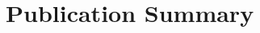\newcommand{\arxiv}[1]{[\href{http://arxiv.org/abs/#1}{arXiv:#1}]}
\def\zero{0}
\def\one{1}
\newcommand{\citeCount}[1]{%
  \def\val{#1}
  \ifx\val\zero%
  \else%
    \ifx\val\one%
    (1~citation)%
    \else%
    (#1~citations)%
    \fi%
  \fi}

\renewcommand{\citeCount}[1]{}


\setcounter{numPubs}{71}
\setcounter{pubCounter}{\value{numPubs}}


\newif\ifshowpubsummary
\showpubsummarytrue
\ifshowpubsummary
\section{Publication Summary}

